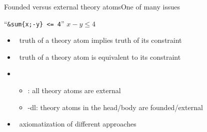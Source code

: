 \begin{frame}{Founded versus external theory atoms}{One of many issues}
  \begin{center}
    ``\texttt{\&sum\{x;-y\} <= 4}'' \qquad\qquad $x-y\leq 4$
   \end{center}
   \bigskip
  \begin{itemize}
    \item<2->   \ truth of a theory atom implies truth of its constraint
    \item<2->  \ truth of a theory atom is equivalent to its constraint
      \bigskip
    \item<3-> 
      \begin{itemize}
      \item \clingcon:  all theory atoms are external
      \item \clingo-dl: theory atoms in the head/body are founded/external
      \end{itemize}
      \medskip
    \item<3->  \ axiomatization of different approaches
  \end{itemize}
\end{frame}
%
